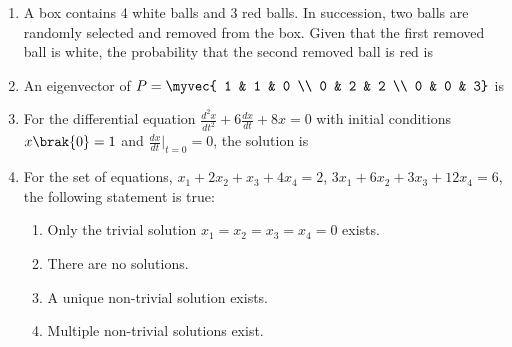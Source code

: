 \documentclass[12pt]{article}
\theoremstyle{remark}
\begin{document}
\begin{enumerate}
\item A box contains 4 white balls and 3 red balls. In succession, two balls are randomly selected and removed from the box. Given that the first removed ball is white, the probability that the second removed ball is red is
\begin{enumerate}
\end{enumerate}
\hfill{}

\item An eigenvector of $P=\myvec{ 1 & 1 & 0 \\ 0 & 2 & 2 \\ 0 & 0 & 3}$ is
\begin{enumerate}
\end{enumerate}
\hfill{}

\item For the differential equation $\frac{d^2x}{dt^2} + 6\frac{dx}{dt} + 8x = 0$ with initial conditions $x\brak{0}=1$ and $\frac{dx}{dt}|_{t=0}=0$, the solution is
\begin{enumerate}
\end{enumerate}
\hfill{}

\item For the set of equations, $x_1 + 2x_2 + x_3 + 4x_4 = 2$, $3x_1 + 6x_2 + 3x_3 + 12x_4 = 6$, the following statement is true:
\begin{enumerate}
    \item Only the trivial solution $x_1=x_2=x_3=x_4=0$ exists.
    \item There are no solutions.
    \item A unique non-trivial solution exists.
    \item Multiple non-trivial solutions exist.
\end{enumerate}
\hfill{}


\end{enumerate}
\end{document}
